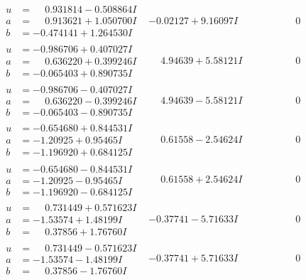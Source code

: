\documentclass[1p]{elsarticle_modified}
\theoremstyle{definition}
\begin{document}
$$\begin{array}{c|c|c}
\begin{aligned}
u &= \phantom{-}0.931814 - 0.508864 I \\
a &= \phantom{-}0.913621 + 1.050700 I \\
b &= -0.474141 + 1.264530 I\end{aligned}
 & -0.02127 + 9.16097 I & \phantom{-0.000000 } 0 \\ \hline\begin{aligned}
u &= -0.986706 + 0.407027 I \\
a &= \phantom{-}0.636220 + 0.399246 I \\
b &= -0.065403 + 0.890735 I\end{aligned}
 & \phantom{-}4.94639 + 5.58121 I & \phantom{-0.000000 } 0 \\ \hline\begin{aligned}
u &= -0.986706 - 0.407027 I \\
a &= \phantom{-}0.636220 - 0.399246 I \\
b &= -0.065403 - 0.890735 I\end{aligned}
 & \phantom{-}4.94639 - 5.58121 I & \phantom{-0.000000 } 0 \\ \hline\begin{aligned}
u &= -0.654680 + 0.844531 I \\
a &= -1.20925 + 0.95465 I \\
b &= -1.196920 + 0.684125 I\end{aligned}
 & \phantom{-}0.61558 - 2.54624 I & \phantom{-0.000000 } 0 \\ \hline\begin{aligned}
u &= -0.654680 - 0.844531 I \\
a &= -1.20925 - 0.95465 I \\
b &= -1.196920 - 0.684125 I\end{aligned}
 & \phantom{-}0.61558 + 2.54624 I & \phantom{-0.000000 } 0 \\ \hline\begin{aligned}
u &= \phantom{-}0.731449 + 0.571623 I \\
a &= -1.53574 + 1.48199 I \\
b &= \phantom{-}0.37856 + 1.76760 I\end{aligned}
 & -0.37741 - 5.71633 I & \phantom{-0.000000 } 0 \\ \hline\begin{aligned}
u &= \phantom{-}0.731449 - 0.571623 I \\
a &= -1.53574 - 1.48199 I \\
b &= \phantom{-}0.37856 - 1.76760 I\end{aligned}
 & -0.37741 + 5.71633 I & \phantom{-0.000000 } 0 \\ \hline\begin{aligned}

\end{aligned}
\end{array}$$
\end{document}
